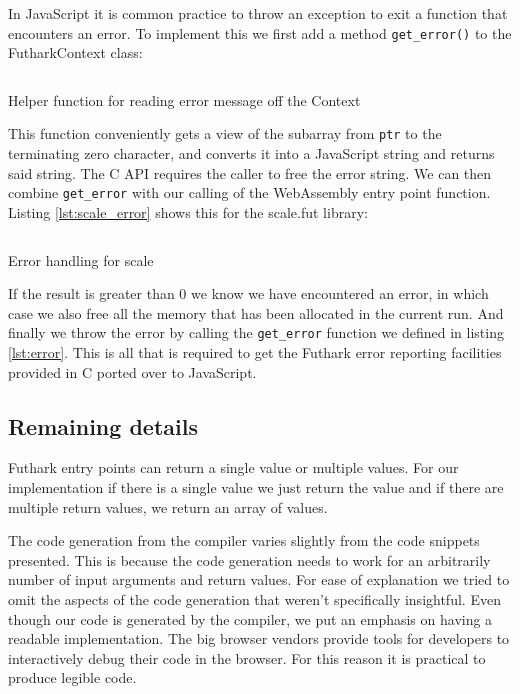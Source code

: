 \documentclass[11pt]{book}
\begin{document}
In JavaScript it is common practice to throw an exception to exit a function that encounters an  error. To implement this we first add a method \texttt{get\_error()} to the FutharkContext class:
\begin{listing}[H] 
        \inputminted[fontsize=\small,baselinestretch=0.5,linenos]{JavaScript}{code/compiler/api_examples/error.js}
        \caption{Helper function for reading error message off the Context}
        \label{lst:error}    
\end{listing} 

This function conveniently gets a view of the subarray from \texttt{ptr} to the terminating zero character, and converts it into a JavaScript string and returns said string. The C API requires the caller to free the error string. We can then combine \texttt{get\_error} with our calling of the WebAssembly entry point function. Listing \ref{lst:scale_error} shows this for the scale.fut library:

\begin{listing}[H] 
        \inputminted[fontsize=\small,baselinestretch=0.5,linenos]{JavaScript}{code/compiler/api_examples/error_main.js}
        \caption{Error handling for scale}
        \label{lst:scale_error}    
\end{listing} 

If the result is greater than 0 we know we have encountered an error, in which case we also free all the memory that has been allocated in the current run. And finally we throw the error by calling the \texttt{get\_error} function we defined in listing \ref{lst:error}. This is all that is required to get the Futhark error reporting facilities provided in C ported over to JavaScript.



\subsection{Remaining details}
Futhark entry points can return a single value or multiple values. For our implementation if there is a single value we just return the value and if there are multiple return values, we return an array of values. 

The code generation from the compiler varies slightly from the code snippets presented. This is because the code generation needs to work for an arbitrarily number of input arguments and return values. For ease of explanation we tried to omit the aspects of the code generation that weren't specifically insightful. Even though our code is generated by the compiler, we put an emphasis on having a readable implementation. The big browser vendors provide tools for developers to interactively debug their code in the browser. For this reason it is practical to produce legible code.
\end{document}
